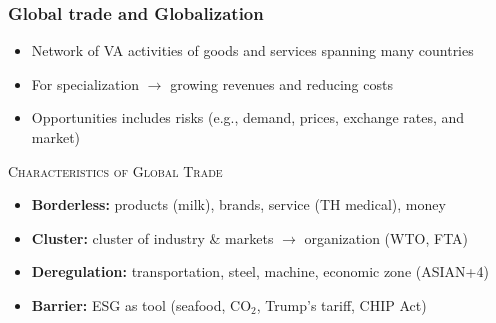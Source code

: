 \documentclass[10pt,presentation]{beamer}
\begin{document}
\begin{frame}
  \frametitle{Global trade and Globalization}

  \begin{itemize}
    \item Network of VA activities of goods and services spanning many countries
    \item For specialization $\rightarrow$ \alert{growing revenues} and \alert{reducing costs}
    \item Opportunities includes  \alert{risks} (e.g., demand, prices, exchange rates, and market)
  \end{itemize}

  \NextLine
  \textsc{Characteristics of Global Trade}
  \begin{itemize}
    \item \textbf{Borderless:} products (milk), brands, service (TH medical), money
    \item \textbf{Cluster:} cluster of industry \& markets $\rightarrow$ organization (WTO, FTA)
    \item \textbf{Deregulation:} transportation, steel, machine, economic zone (ASIAN+4)
    \item \textbf{Barrier:} ESG as tool (seafood, CO$_2$, Trump's tariff, CHIP Act)
  \end{itemize}



\end{frame}
\end{document}
